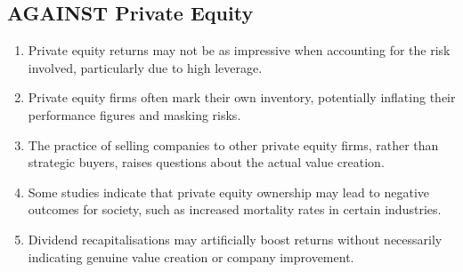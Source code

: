 \subsection*{AGAINST Private Equity}

\begin{enumerate}
    \item Private equity returns may not be as impressive when accounting for the risk involved, particularly due to high leverage.
    \item Private equity firms often mark their own inventory, potentially inflating their performance figures and masking risks.
    \item The practice of selling companies to other private equity firms, rather than strategic buyers, raises questions about the actual value creation.
    \item Some studies indicate that private equity ownership may lead to negative outcomes for society, such as increased mortality rates in certain industries.
    \item Dividend recapitalisations may artificially boost returns without necessarily indicating genuine value creation or company improvement.
\end{enumerate}


